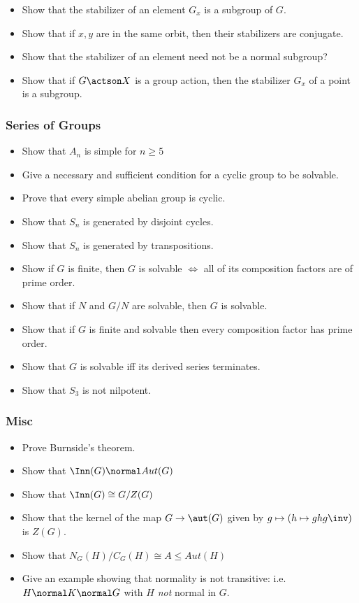 \begin{itemize}
\tightlist
\item
  Show that the stabilizer of an element \(G_x\) is a subgroup of \(G\).
\item
  Show that if \(x, y\) are in the same orbit, then their stabilizers
  are conjugate.
\item
  Show that the stabilizer of an element need not be a normal subgroup?
\item
  Show that if \(G \actson X\) is a group action, then the stabilizer
  \(G_x\) of a point is a subgroup.
\end{itemize}

\hypertarget{series-of-groups-1}{%
\subsubsection{Series of Groups}\label{series-of-groups-1}}

\begin{itemize}
\tightlist
\item
  Show that \(A_n\) is simple for \(n\geq 5\)
\item
  Give a necessary and sufficient condition for a cyclic group to be
  solvable.
\item
  Prove that every simple abelian group is cyclic.
\item
  Show that \(S_n\) is generated by disjoint cycles.
\item
  Show that \(S_n\) is generated by transpositions.
\item
  Show if \(G\) is finite, then \(G\) is solvable \(\iff\) all of its
  composition factors are of prime order.
\item
  Show that if \(N\) and \(G/N\) are solvable, then \(G\) is solvable.
\item
  Show that if \(G\) is finite and solvable then every composition
  factor has prime order.
\item
  Show that \(G\) is solvable iff its derived series terminates.
\item
  Show that \(S_3\) is not nilpotent.
\end{itemize}

\hypertarget{misc}{%
\subsubsection{Misc}\label{misc}}

\begin{itemize}
\item
  Prove Burnside's theorem.
\item
  Show that \(\Inn(G) \normal Aut(G)\)
\item
  Show that \(\Inn(G) \cong G / Z(G)\)
\item
  Show that the kernel of the map \(G\to \aut(G)\) given by
  \(g\mapsto (h\mapsto ghg\inv)\) is \(Z(G)\).
\item
  Show that \(N_G(H) / C_G(H) \cong A \leq Aut(H)\)
\item
  Give an example showing that normality is not transitive:
  i.e.~\(H\normal K \normal G\) with \(H\) \emph{not} normal in \(G\).
\end{itemize}

